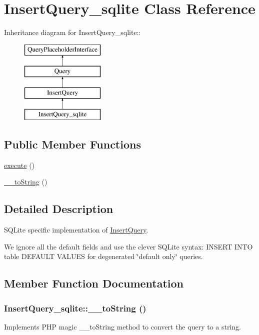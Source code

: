\hypertarget{classInsertQuery__sqlite}{
\section{InsertQuery\_\-sqlite Class Reference}
\label{classInsertQuery__sqlite}
}
Inheritance diagram for InsertQuery\_\-sqlite::\begin{figure}[H]
\begin{center}
\leavevmode
\includegraphics[height=4cm]{classInsertQuery__sqlite}
\end{center}
\end{figure}
\subsection*{Public Member Functions}
\begin{DoxyCompactItemize}
\item 
\hyperlink{classInsertQuery__sqlite_a95e8f7db8b3517715f222bf958e39ab9}{execute} ()
\item 
\hyperlink{classInsertQuery__sqlite_a67c0e3204921c1a8af4edc3fb60ba97c}{\_\-\_\-toString} ()
\end{DoxyCompactItemize}


\subsection{Detailed Description}
SQLite specific implementation of \hyperlink{classInsertQuery}{InsertQuery}.

We ignore all the default fields and use the clever SQLite syntax: INSERT INTO table DEFAULT VALUES for degenerated \char`\"{}default only\char`\"{} queries. 

\subsection{Member Function Documentation}
\hypertarget{classInsertQuery__sqlite_a67c0e3204921c1a8af4edc3fb60ba97c}{
\subsubsection[{\_\-\_\-toString}]{\setlength{\rightskip}{0pt plus 5cm}InsertQuery\_\-sqlite::\_\-\_\-toString ()}}
\label{classInsertQuery__sqlite_a67c0e3204921c1a8af4edc3fb60ba97c}
Implements PHP magic \_\-\_\-toString method to convert the query to a string.

